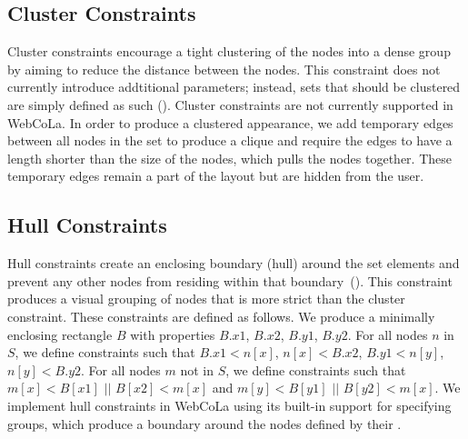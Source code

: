 \subsection{Cluster Constraints}
Cluster constraints encourage a tight clustering of the nodes into a dense group by
aiming to reduce the distance between the nodes. This constraint does not
currently introduce addtitional parameters; instead, sets that should be
clustered are simply defined as such ().
Cluster constraints are not currently supported in WebCoLa. In order to
produce a clustered appearance, we add temporary edges between all nodes
in the set to produce a clique and require the edges to have a length shorter
than the size of the nodes, which pulls the nodes together. These temporary edges
remain a part of the layout but are hidden from the user.

\subsection{Hull Constraints}
Hull constraints create an enclosing boundary (hull) around the set elements and 
prevent any other nodes from residing within that 
boundary~(). 
This constraint produces a visual grouping of nodes that is more strict than the cluster constraint.
These constraints are defined as follows. We produce a minimally enclosing rectangle 
$B$ with properties $B.x1$, $B.x2$, $B.y1$, $B.y2$. For all nodes
$n$ in $S$, we define constraints such that $B.x1 < n[x]$, \mbox{$n[x] < B.x2$},
$B.y1 < n[y]$, $n[y] < B.y2$. For all nodes $m$ not in $S$, we define
constraints such that $m[x] < B[x1]$ $||$ $B[x2] < m[x]$ and $m[y] < B[y1]$ $||$ $B[y2] < m[x]$.
We implement hull constraints in WebCoLa using its built-in support for 
specifying groups, which produce a boundary around 
the nodes defined by their .


\vspace{-10px}
